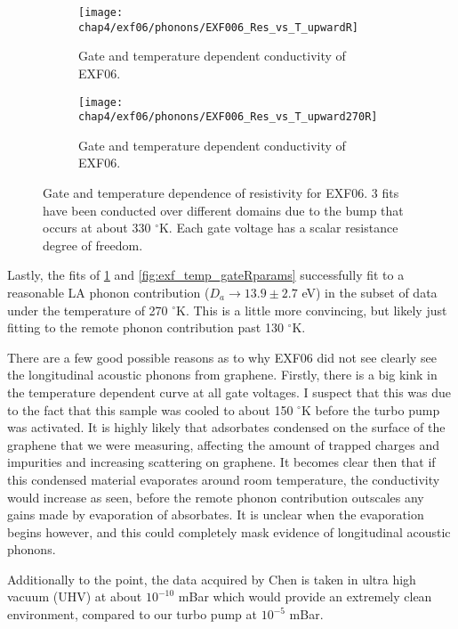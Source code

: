\documentclass[../Matt_Gebert_Honours_Thesis.tex]{subfiles}
\begin{document}
\begin{figure}[H]
	\begin{subfigure}[b]{0.5\textwidth}
		\centering
		\texttt{[image: chap4/exf06/phonons/EXF006\_Res\_vs\_T\_upwardR]}
		\caption[EXF06 temperature dependent conductivity]{Gate and temperature dependent conductivity of EXF06.}\label{fig:exf_temp_gateR}
	\end{subfigure}
	\begin{subfigure}[b]{0.5\textwidth}
		\centering
		\texttt{[image: chap4/exf06/phonons/EXF006\_Res\_vs\_T\_upward270R]}
		\caption[EXF06 temperature dependent conductivity]{Gate and temperature dependent conductivity of EXF06.}\label{fig:exf_temp_gate_zoomR}
	\end{subfigure}
	\caption[Gate and temperature dependence of resistivity for EXF06 with R flexibility]{Gate and temperature dependence of resistivity for EXF06. 3 fits have been conducted over different domains due to the bump that occurs at about 330 $^\circ$K. Each gate voltage has a scalar resistance degree of freedom.}
\end{figure}

Lastly, the fits of \cref{fig:exf_temp_gateR} and \cref{fig:exf_temp_gateRparams} successfully fit to a reasonable LA phonon contribution ($D_a\to 13.9\pm 2.7$ eV) in the subset of data under the temperature of 270 $^\circ$K. This is a little more convincing, but likely just fitting to the remote phonon contribution past 130 $^\circ$K. 


There are a few good possible reasons as to why EXF06 did not see clearly see the longitudinal acoustic phonons from graphene. Firstly, there is a big kink in the temperature dependent curve at all gate voltages. I suspect that this was due to the fact that this sample was cooled to about 150 $^\circ$K before the turbo pump was activated. It is highly likely that adsorbates condensed on the surface of the graphene that we were measuring, affecting the amount of trapped charges and impurities and increasing scattering on graphene. It becomes clear then that if this condensed material evaporates around room temperature, the conductivity would increase as seen, before the remote phonon contribution outscales any gains made by evaporation of absorbates. It is unclear when the evaporation begins however, and this could completely mask evidence of longitudinal acoustic phonons.

Additionally to the point, the data acquired by Chen \etal is taken in ultra high vacuum (UHV) at about $10^{-10}$ mBar which would provide an extremely clean environment, compared to our turbo pump at $10^{-5}$ mBar.
\end{document}
